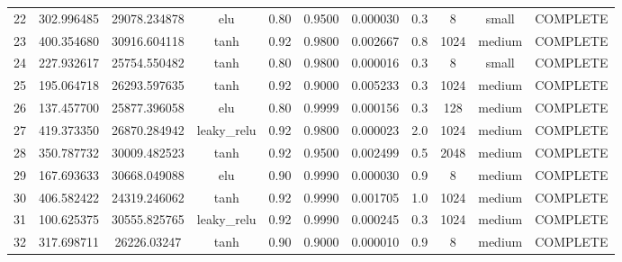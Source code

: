 \begin{longtable}{ccccccccccc}
                       22 &                 302.996485 &                       29078.234878 &             elu &        0.80 & 0.9500 &       0.000030 &             0.3 &        8 &     small & COMPLETE \\
                       23 &                 400.354680 &                       30916.604118 &            tanh &        0.92 & 0.9800 &       0.002667 &             0.8 &     1024 &    medium & COMPLETE \\
                       24 &                 227.932617 &                       25754.550482 &            tanh &        0.80 & 0.9800 &       0.000016 &             0.3 &        8 &     small & COMPLETE \\
                       25 &                 195.064718 &                       26293.597635 &            tanh &        0.92 & 0.9000 &       0.005233 &             0.3 &     1024 &    medium & COMPLETE \\
                       26 &                 137.457700 &                       25877.396058 &             elu &        0.80 & 0.9999 &       0.000156 &             0.3 &      128 &    medium & COMPLETE \\
                       27 &                 419.373350 &                       26870.284942 &     leaky\_relu &        0.92 & 0.9800 &       0.000023 &             2.0 &     1024 &    medium & COMPLETE \\
                       28 &                 350.787732 &                       30009.482523 &            tanh &        0.92 & 0.9500 &       0.002499 &             0.5 &     2048 &    medium & COMPLETE \\
                       29 &                 167.693633 &                       30668.049088 &             elu &        0.90 & 0.9990 &       0.000030 &             0.9 &        8 &    medium & COMPLETE \\
                       30 &                 406.582422 &                       24319.246062 &            tanh &        0.92 & 0.9990 &       0.001705 &             1.0 &     1024 &    medium & COMPLETE \\
                       31 &                 100.625375 &                       30555.825765 &     leaky\_relu &        0.92 & 0.9990 &       0.000245 &             0.3 &     1024 &    medium & COMPLETE \\
                       32 &                 317.698711 &                        26226.03247 &            tanh &        0.90 & 0.9000 &       0.000010 &             0.9 &        8 &    medium & COMPLETE \\

\end{longtable}
